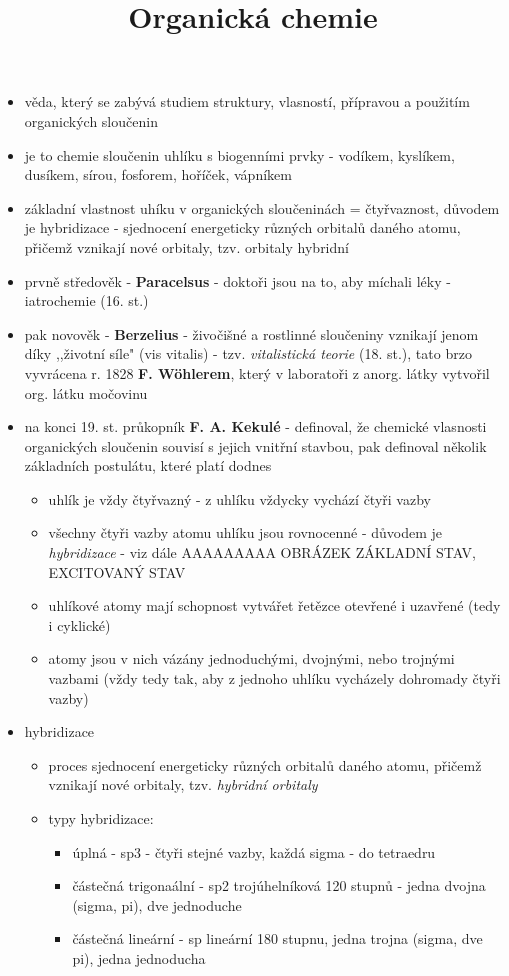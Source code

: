 \documentclass{article}
\title{\vspace{-2cm}Organická chemie\vspace{-1.7cm}}
\date{}
\author{}
\begin{document}
\maketitle

\begin{itemize}
  \item věda, který se zabývá studiem struktury, vlasností, přípravou a použitím organických sloučenin
  \item je to chemie sloučenin uhlíku s biogenními prvky - vodíkem, kyslíkem, dusíkem, sírou, fosforem, hoříček, vápníkem
  \item základní vlastnost uhíku v organických sloučeninách = čtyřvaznost, důvodem je hybridizace - sjednocení energeticky různých orbitalů daného atomu, přičemž vznikají nové orbitaly, tzv. orbitaly hybridní
  \item prvně středověk - \textbf{Paracelsus} - doktoři jsou na to, aby míchali léky - iatrochemie (16. st.)
  \item pak novověk - \textbf{Berzelius} - živočišné a rostlinné sloučeniny vznikají jenom díky ,,životní síle" (vis vitalis) - tzv. \textit{vitalistická teorie} (18. st.), tato brzo vyvrácena r. 1828 \textbf{F. Wöhlerem}, který v laboratoři z anorg. látky vytvořil org. látku močovinu
  \item na konci 19. st. průkopník \textbf{F. A. Kekulé} - definoval, že chemické vlasnosti organických sloučenin souvisí s jejich vnitřní stavbou, pak definoval několik základních postulátu, které platí dodnes
  \begin{itemize}
    \item uhlík je vždy čtyřvazný - z uhlíku vždycky vychází čtyři vazby
    \item všechny čtyři vazby atomu uhlíku jsou rovnocenné - důvodem je \textit{hybridizace} - viz dále
    AAAAAAAAA OBRÁZEK ZÁKLADNÍ STAV, EXCITOVANÝ STAV
    \item uhlíkové atomy mají schopnost vytvářet řetězce otevřené i uzavřené (tedy i cyklické)
    \item atomy jsou v nich vázány jednoduchými, dvojnými, nebo trojnými vazbami (vždy tedy tak, aby z jednoho uhlíku vycházely dohromady čtyři vazby)
  \end{itemize}
  \item hybridizace
  \begin{itemize}
    \item proces sjednocení energeticky různých orbitalů daného atomu, přičemž vznikají nové orbitaly, tzv. \textit{hybridní orbitaly}
    \item typy hybridizace:
    \begin{itemize}
      \item úplná - sp3 - čtyři stejné vazby, každá sigma - do tetraedru
      \item částečná trigonaální - sp2 trojúhelníková 120 stupnů - jedna dvojna (sigma, pi), dve jednoduche
      \item částečná lineární - sp lineární 180 stupnu, jedna trojna (sigma, dve pi), jedna jednoducha
    \end{itemize}


\end{itemize}
\end{itemize}
\end{document}

